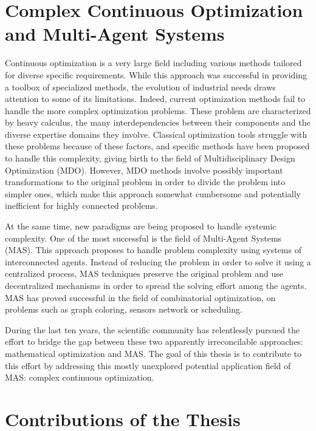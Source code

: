  \label{introduction}

\section*{Complex Continuous Optimization and Multi-Agent Systems}

Continuous optimization is a very large field including various methods tailored for diverse specific requirements. While this approach was successful in providing a toolbox of specialized methods, the evolution of industrial needs draws attention to some of its limitations. Indeed, current optimization methods fail to handle the more complex optimization problems. These problem are characterized by heavy calculus, the many interdependencies between their components and the diverse expertise domains they involve. Classical optimization tools struggle with these problems because of these factors, and specific methods have been proposed to handle this complexity, giving birth to the field of Multidisciplinary Design Optimization (MDO). However,  MDO methods involve possibly important transformations to the original problem in order to divide the problem into simpler ones, which make this approach somewhat cumbersome and potentially inefficient for highly connected problems.

At the same time, new paradigms are being proposed to handle systemic complexity. One of the most successful is the field of Multi-Agent Systems (MAS). This approach proposes to handle problem complexity using systems of interconnected agents. Instead of reducing the problem in order to solve it using a centralized process, MAS techniques preserve the original problem and use decentralized mechanisms in order to spread the solving effort among the agents. MAS has proved successful in the field of combinatorial optimization, on problems such as graph coloring, sensors network or scheduling.

During the last ten years, the scientific community has relentlessly pursued the effort to bridge the gap between these two apparently irreconcilable approaches: mathematical optimization and MAS. The goal of this thesis is to contribute to this effort by addressing this mostly unexplored potential application field of MAS: complex continuous optimization.

\section*{Contributions of the Thesis}

